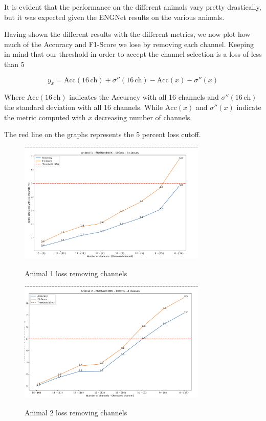 \documentclass{Configuration_Files/PoliMi3i_thesis}
\begin{document}
It is evident that the performance on the different animals vary pretty drastically, but it was expected given the ENGNet results on the various animals.

Having shown the different results with the different metrics, we now plot how much of the Accuracy and F1-Score we lose by removing each channel.
Keeping in mind that our threshold in order to accept the channel selection is a loss of less than 5%

\[
y_x = \text{Acc}(16 \, \text{ch}) + \sigma''(16 \, \text{ch}) - \text{Acc}(x) - \sigma''(x)
\]

Where $\text{Acc}(16 \, \text{ch})$ indicates the Accuracy with all 16 channels and $\sigma''(16 \, \text{ch})$ the standard deviation with all 16 channels.
While $\text{Acc}(x)$ and $\sigma''(x)$ indicate the metric computed with $x$ decreasing number of channels.

The red line on the graphs represents the 5 percent loss cutoff.

\begin{figure}[H]
    \centering
    \includegraphics[width=0.8\textwidth]{Results Matteo/figure6}
    \label{figure6}
    \caption{Animal 1 loss removing channels}
\end{figure}

\begin{figure}[H]
    \centering
    \includegraphics[width=0.8\textwidth]{Results Matteo/figure7}
    \label{figure7}
    \caption{Animal 2 loss removing channels}
\end{figure}
\end{document}

